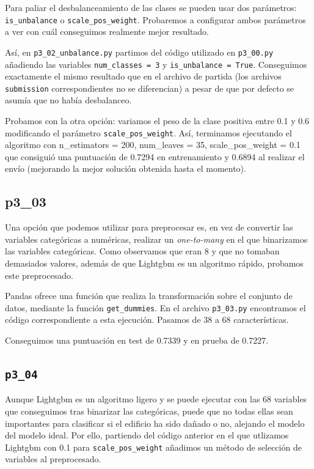 \documentclass[a4paper, 20pt]{article}
\begin{document}
Para paliar el desbalanceamiento de las clases se pueden usar dos parámetros: \texttt{is\_unbalance} o \texttt{scale\_pos\_weight}.
Probaremos a configurar ambos parámetros a ver con cuál conseguimos realmente mejor resultado.

Así, en \texttt{p3\_02\_unbalance.py} partimos del código utilizado en \texttt{p3\_00.py} añadiendo las variables \texttt{num\_classes = 3} y \texttt{is\_unbalance = True}. Conseguimos exactamente el mismo resultado que en el archivo de partida (los archivos \texttt{submission} correspondientes no se diferencian) a pesar de que por defecto se asumía que no había desbalanceo. 

Probamos con la otra opción: variamos el peso de la clase positiva entre 0.1 y 0.6 modificando el parámetro \texttt{scale\_pos\_weight}.
Así, terminamos ejecutando el algoritmo con {\ttfamily n\_estimators = 200, num\_leaves = 35, scale\_pos\_weight = 0.1} que consiguió una puntuación de 0.7294 en entrenamiento y 0.6894 al realizar el envío (mejorando la mejor solución obtenida hasta el momento).

\subsection{p3\_03}
Una opción que podemos utilizar para preprocesar es, en vez de convertir las variables categóricas a numéricas, realizar un \textit{one-to-many} en el que binarizamos las variables categóricas. Como observamos que eran 8 y que no tomaban demasiados valores, además de que Lightgbm es un algoritmo rápido, probamos este preprocesado. 

Pandas ofrece una función que realiza la transformación sobre el conjunto de datos, mediante la función \texttt{get\_dummies}. En el archivo \texttt{p3\_03.py} encontramos el código correspondiente a esta ejecución. Pasamos de 38 a 68 características.

Conseguimos una puntuación en test de 0.7339 y en prueba de 0.7227.

\subsection{\texttt{p3\_04}}

Aunque Lightgbm es un algoritmo ligero y se puede ejecutar con las 68 variables que conseguimos tras binarizar las categóricas, puede que no todas ellas sean importantes para clasificar si el edificio ha sido dañado o no, alejando el modelo del modelo ideal. Por ello, partiendo del código anterior en el que utlizamos Lightgbm con 0.1 para \texttt{scale\_pos\_weight} añadimos un método de selección de variables al preprocesado.
\end{document}
